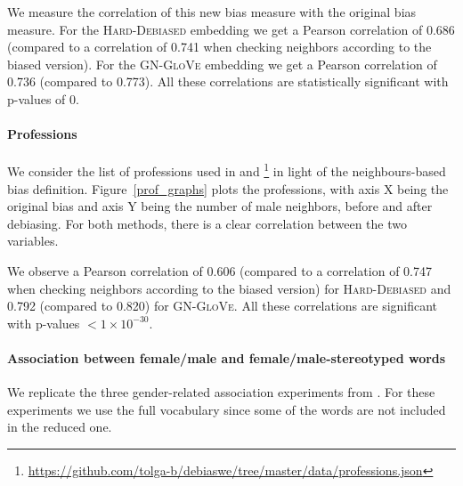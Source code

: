 \documentclass[11pt,a4paper]{article}
\begin{document}
	We measure the correlation of this new bias measure with the original bias measure. For the \textsc{Hard-Debiased} embedding we get a Pearson correlation of 0.686 (compared to a correlation of 0.741 when checking neighbors according to the biased version). For the \textsc{GN-GloVe} embedding we get a Pearson correlation of 0.736 (compared to 0.773). All these correlations are statistically significant with p-values of 0. 
	
	\paragraph{Professions}


	We consider the list of professions used in \citet{BCZ16} and \citet{ZZL18}\footnote{\url{https://github.com/tolga-b/debiaswe/tree/master/data/professions.json}} in light of the neighbours-based bias definition.
	Figure~\ref{prof_graphs} plots the professions, with axis X being the original bias and axis Y being the number of male neighbors, before and after debiasing. For both methods, there is a clear correlation between the two variables.
	
	We observe a Pearson correlation of 0.606 (compared to a correlation of 0.747 when checking neighbors according to the biased version) for \textsc{Hard-Debiased} and 0.792 (compared to 0.820) for \textsc{GN-GloVe}. All these correlations are significant with p-values $<1\times10^{-30}$.

	
	\paragraph{Association between female/male and female/male-stereotyped words}
	We replicate the three gender-related association experiments from \citet{CBN17}. For these experiments we use the full vocabulary since some of the words are not included in the reduced one.
	
\end{document}
